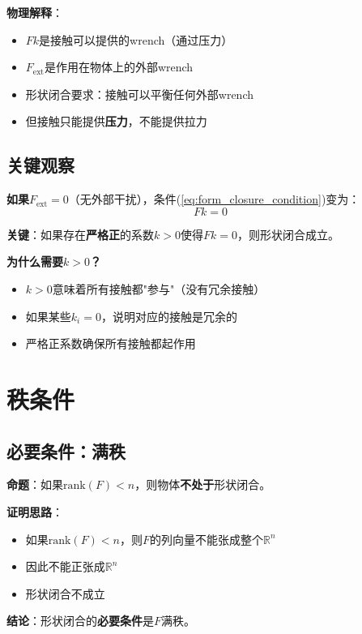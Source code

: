 \documentclass[12pt,a4paper]{article}
\begin{document}
\textbf{物理解释}：
\begin{itemize}
\item $F k$是接触可以提供的wrench（通过压力）
\item $F_{\text{ext}}$是作用在物体上的外部wrench
\item 形状闭合要求：接触可以平衡任何外部wrench
\item 但接触只能提供\textbf{压力}，不能提供拉力
\end{itemize}

\subsection{关键观察}

\textbf{如果$F_{\text{ext}} = 0$}（无外部干扰），条件(\ref{eq:form_closure_condition})变为：
\begin{equation}
F k = 0
\end{equation}

\textbf{关键}：如果存在\textbf{严格正}的系数$k > 0$使得$F k = 0$，则形状闭合成立。

\textbf{为什么需要$k > 0$？}
\begin{itemize}
\item $k > 0$意味着所有接触都"参与"（没有冗余接触）
\item 如果某些$k_i = 0$，说明对应的接触是冗余的
\item 严格正系数确保所有接触都起作用
\end{itemize}

\section{秩条件}

\subsection{必要条件：满秩}

\textbf{命题}：如果$\text{rank}(F) < n$，则物体\textbf{不处于}形状闭合。

\textbf{证明思路}：
\begin{itemize}
\item 如果$\text{rank}(F) < n$，则$F$的列向量不能张成整个$\mathbb{R}^n$
\item 因此不能正张成$\mathbb{R}^n$
\item 形状闭合不成立
\end{itemize}

\textbf{结论}：形状闭合的\textbf{必要条件}是$F$满秩。
\end{document}
